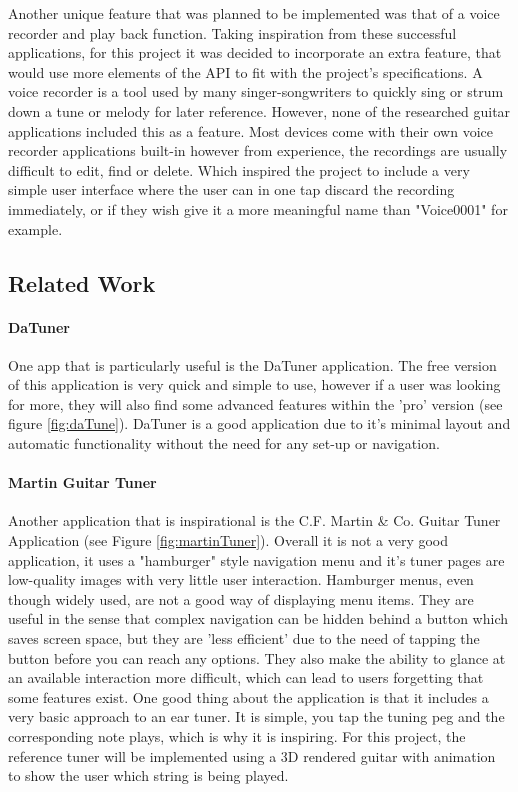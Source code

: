 \documentclass[conference]{acmsiggraph}
\begin{document}
Another unique feature that was planned to be implemented was that of a voice recorder and play back function. Taking inspiration from these successful applications, for this project it was decided to incorporate an extra feature, that would use more elements of the API to fit with the project's specifications. A voice recorder is a tool used by many singer-songwriters to quickly sing or strum down a tune or melody for later reference. However, none of the researched guitar applications included this as a feature. Most devices come with their own voice recorder applications built-in however from experience, the recordings are usually difficult to edit, find or delete. Which inspired the project to include a very simple user interface where the user can in one tap discard the recording immediately, or if they wish give it a more meaningful name than "Voice0001" for example.  

\subsection{Related Work}

\paragraph{DaTuner} One app that is particularly useful is the DaTuner application. The free version of this application is very quick and simple to use, however if a user was looking for more, they will also find some advanced features within the 'pro' version (see figure \ref{fig:daTune}). DaTuner is a good application due to it's minimal layout and automatic functionality without the need for any set-up or navigation.


\paragraph{Martin Guitar Tuner} Another application that is inspirational is the C.F. Martin \& Co. Guitar Tuner Application (see Figure \ref{fig:martinTuner}). Overall it is not a very good application, it uses a "hamburger" style navigation menu and it's tuner pages are low-quality images with very little user interaction. Hamburger menus, even though widely used, are not a good way of displaying menu items. They are useful in the sense that complex navigation can be hidden behind a button which saves screen space, but they are 'less efficient' due to the need of tapping the button before you can reach any options. They also make the ability to glance at an available interaction more difficult, which can lead to users forgetting that some features exist. \cite{hamburger} One good thing about the application is that it includes a very basic approach to an ear tuner. It is simple, you tap the tuning peg and the corresponding note plays, which is why it is inspiring. For this project, the reference tuner will be implemented using a 3D rendered guitar with animation to show the user which string is being played.
\end{document}
